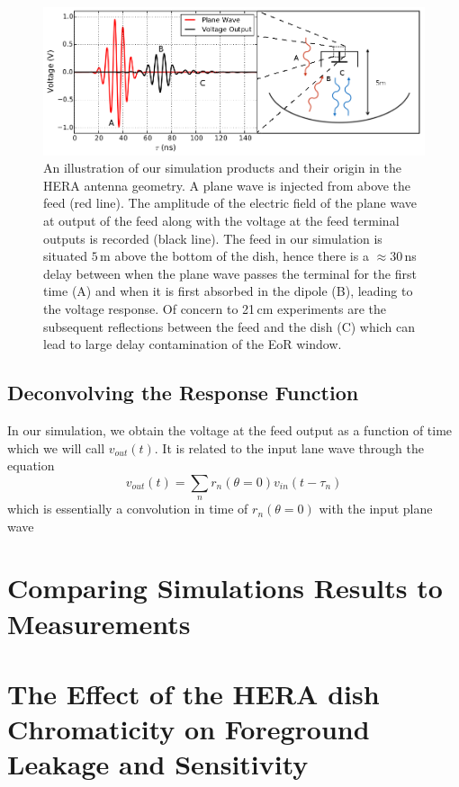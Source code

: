 \documentclass[twocolumn]{emulateapj}
\begin{document}
\begin{figure}
\includegraphics[width=\textwidth]{figures/SimulationIllustration.png}
\caption{An illustration of our simulation products and their origin in the HERA antenna geometry. A plane wave is injected from above the feed (red line). The amplitude of the electric field of the plane wave at output of the feed along with the voltage at the feed terminal outputs is recorded (black line). The feed in our simulation is situated $5$\,m above the bottom of the dish, hence there is a $\approx 30$\,ns delay between when the plane wave passes the terminal for the first time (A) and when it is first absorbed in the dipole (B), leading to the voltage response. Of concern to 21\,cm experiments are the subsequent reflections between the feed and the dish (C) which can lead to large delay contamination of the EoR window.}
\label{fig:Simulation}
\end{figure}
\subsection{Deconvolving the Response Function}
In our simulation, we obtain the voltage at the feed output as a function of time which we will call $v_{out}(t)$. It is related to the input lane wave through the equation 
\begin{equation}
v_{out}(t) = \sum_n r_n(\theta=0) v_{in}(t - \tau_n)
\end{equation}
which is essentially a convolution in time of $r_n(\theta=0)$ with the input plane wave 
\section{Comparing Simulations Results to Measurements}
\label{sec:Comparison}
\section{The Effect of the HERA dish Chromaticity on Foreground Leakage and Sensitivity}
\label{sec:Foregrounds}
\end{document}

